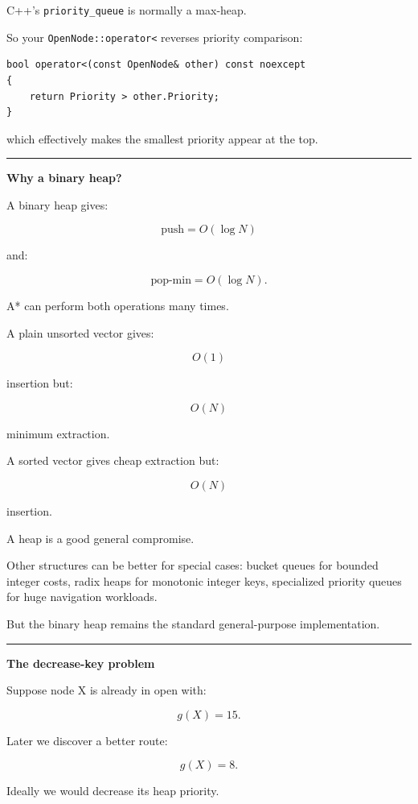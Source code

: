 C++'s \texttt{priority\_queue} is normally a max-heap.

So your \texttt{OpenNode::operator\textless{}} reverses priority comparison:

\begin{verbatim}
bool operator<(const OpenNode& other) const noexcept
{
    return Priority > other.Priority;
}
\end{verbatim}

which effectively makes the smallest priority appear at the top.

\begin{center}\rule{0.5\linewidth}{0.5pt}\end{center}

\textbf{Why a binary heap?}

A binary heap gives:

\[
\text{push}=O(\log N)
\]

and:

\[
\text{pop-min}=O(\log N).
\]

A* can perform both operations many times.

A plain unsorted vector gives:

\[
O(1)
\]

insertion but:

\[
O(N)
\]

minimum extraction.

A sorted vector gives cheap extraction but:

\[
O(N)
\]

insertion.

A heap is a good general compromise.

Other structures can be better for special cases: bucket queues for bounded integer costs, radix heaps for monotonic integer keys, specialized priority queues for huge navigation workloads.

But the binary heap remains the standard general-purpose implementation.

\begin{center}\rule{0.5\linewidth}{0.5pt}\end{center}

\textbf{The decrease-key problem}

Suppose node X is already in open with:

\[
g(X)=15.
\]

Later we discover a better route:

\[
g(X)=8.
\]

Ideally we would decrease its heap priority.

